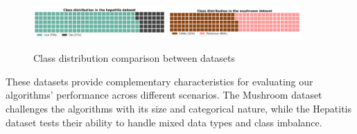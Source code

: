 \begin{figure}
    \centering
    \includegraphics[width=0.45\textwidth]{figures/hepatitis-class-distribution.png}
    \includegraphics[width=0.45\textwidth]{figures/mushroom-class-distribution.png}
    \caption{Class distribution comparison between datasets}
    \label{fig:class-distributions}
\end{figure}

These datasets provide complementary characteristics for evaluating our algorithms' performance across different scenarios. The Mushroom dataset challenges the algorithms with its size and categorical nature, while the Hepatitis dataset tests their ability to handle mixed data types and class imbalance.